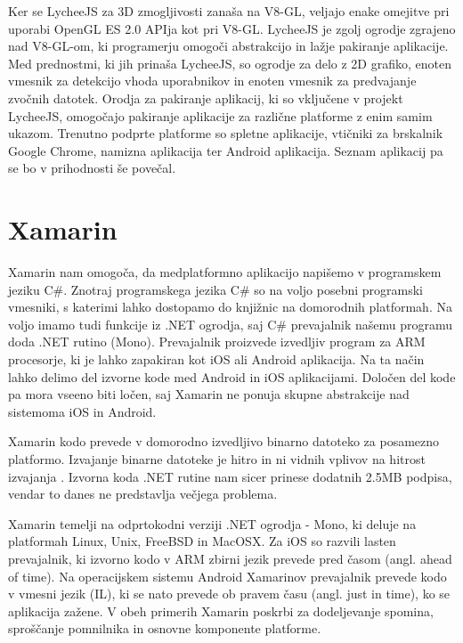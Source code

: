 Ker se LycheeJS za 3D zmogljivosti zanaša na V8-GL, veljajo enake omejitve pri uporabi OpenGL ES 2.0 APIja kot pri V8-GL. LycheeJS je zgolj ogrodje zgrajeno nad V8-GL-om, ki programerju omogoči abstrakcijo in lažje pakiranje aplikacije. Med prednostmi, ki jih prinaša LycheeJS, so ogrodje za delo z 2D grafiko, enoten vmesnik za detekcijo vhoda uporabnikov in enoten vmesnik za predvajanje zvočnih datotek. Orodja za pakiranje aplikacij, ki so vključene v projekt LycheeJS, omogočajo pakiranje aplikacije za različne platforme z enim samim ukazom. Trenutno podprte platforme so spletne aplikacije, vtičniki za brskalnik Google Chrome, namizna aplikacija ter Android aplikacija. Seznam aplikacij pa se bo v prihodnosti še povečal.

\section{Xamarin}
\label{sec:xamarin}

Xamarin nam omogoča, da medplatformno aplikacijo napišemo v programskem jeziku C\#. Znotraj programskega jezika C\# so na voljo posebni programski vmesniki, s katerimi lahko dostopamo do knjižnic na domorodnih platformah. Na voljo imamo tudi funkcije iz .NET ogrodja, saj C\# prevajalnik našemu programu doda .NET rutino (Mono). Prevajalnik proizvede izvedljiv program za ARM procesorje, ki je lahko zapakiran kot iOS ali Android aplikacija. Na ta način lahko delimo del izvorne kode med Android in iOS aplikacijami. Določen del kode pa mora vseeno biti ločen, saj Xamarin ne ponuja skupne abstrakcije nad sistemoma iOS in Android. 

Xamarin kodo prevede v domorodno izvedljivo binarno datoteko za posamezno platformo. Izvajanje binarne datoteke je hitro in ni vidnih vplivov na hitrost izvajanja \cite{xamarin}. Izvorna koda .NET rutine nam sicer prinese dodatnih 2.5MB podpisa, vendar to danes ne predstavlja večjega problema.

Xamarin temelji na odprtokodni verziji .NET ogrodja - Mono, ki deluje na platformah Linux, Unix, FreeBSD in MacOSX. Za iOS so razvili lasten prevajalnik, ki izvorno kodo v ARM zbirni jezik prevede pred časom (angl. ahead of time). Na operacijskem sistemu Android Xamarinov prevajalnik prevede kodo v vmesni jezik (IL), ki se nato prevede ob pravem času (angl. just in time), ko se aplikacija zažene. V obeh primerih Xamarin poskrbi za dodeljevanje spomina, sproščanje pomnilnika in osnovne komponente platforme. %

